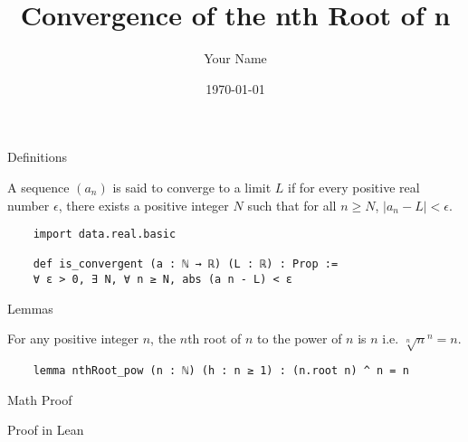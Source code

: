 \documentclass{beamer}
\title{Convergence of the nth Root of n}
\author{Your Name}
\date{\today}
\begin{document}
\begin{frame}
    \titlepage
\end{frame}

\begin{frame}[fragile]{Definitions}
    \begin{definition}
    A sequence $(a_n)$ is said to converge to a limit $L$ if for every positive real number $\epsilon$, there exists a positive integer $N$ such that for all $n \geq N$, $|a_n - L| < \epsilon$.
    \end{definition}

    \begin{lstlisting}
    import data.real.basic

    def is_convergent (a : ℕ → ℝ) (L : ℝ) : Prop :=
    ∀ ε > 0, ∃ N, ∀ n ≥ N, abs (a n - L) < ε
    \end{lstlisting}

\end{frame}

\begin{frame}[fragile]{Lemmas}
    \begin{lemma}
        For any positive integer $n$, the $n$th root of $n$ to the power of $n$ is $n$ i.e. $\sqrt[n]{n}^n = n$.
    \end{lemma}

    \begin{lemma}
    \begin{lstlisting}
    lemma nthRoot_pow (n : ℕ) (h : n ≥ 1) : (n.root n) ^ n = n
    \end{lstlisting}
    \end{lemma}
\end{frame}

\begin{frame}{Math Proof}
\end{frame}

\begin{frame}{Proof in Lean}
\end{frame}
\end{document}
